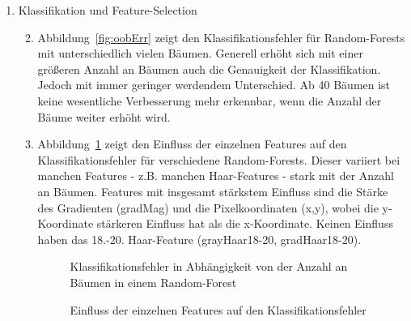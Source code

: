 \documentclass[]{report}
\newlength\figureheight
\newlength\figurewidth
\begin{document}
\begin{enumerate}
		\item Klassifikation und Feature-Selection
			\begin{enumerate}
				\setcounter{enumii}{1}
				\item Abbildung~\ref{fig:oobErr} zeigt den Klassifikationsfehler für Random-Forests mit unterschiedlich vielen Bäumen. Generell erhöht sich mit einer größeren Anzahl an Bäumen auch die Genauigkeit der Klassifikation. Jedoch mit immer geringer werdendem Unterschied. Ab 40 Bäumen ist keine wesentliche Verbesserung mehr erkennbar, wenn die Anzahl der Bäume weiter erhöht wird.
				\item Abbildung~\ref{fig:oobVar} zeigt den Einfluss der einzelnen Features auf den Klassifikationsfehler für verschiedene Random-Forests. Dieser variiert bei manchen Features - z.B. manchen Haar-Features - stark mit der Anzahl an Bäumen. Features mit insgesamt stärkstem Einfluss sind die Stärke des Gradienten (gradMag) und die Pixelkoordinaten (x,y), wobei die y-Koordinate stärkeren Einfluss hat als die x-Koordinate. Keinen Einfluss haben das 18.-20. Haar-Feature (grayHaar18-20, gradHaar18-20).
			\setlength\figureheight{3.5cm}
			\setlength{}
				\begin{figure}
					\centering
					
					\caption{Klassifikationsfehler in Abhängigkeit von der Anzahl an Bäumen in einem Random-Forest}
					\label{fig:oobErr}
					\caption{Einfluss der einzelnen Features auf den Klassifikationsfehler}
					\label{fig:oobVar}
				\end{figure}
			\end{enumerate}
			

\end{enumerate}
\end{document}
